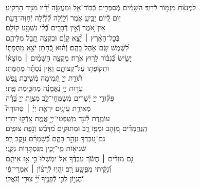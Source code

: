 \documentclass[twoside, openany, parskip=half, 11pt]{book}
\begin{document}
\begin{narrow}


לַמְנַצֵּ֗חַ מִזְמ֥וֹר לְֿדָוִֽד׃ \hfill \break
הַשָּׁמַ֗יִם מְֽֿסַפְּרִ֥ים כְּֿבֽוֹד־אֵ֑ל \hfill וּֽמַעֲשֵׂ֥ה יָ֝דָ֗יו מַגִּ֥יד הָרָקִֽיעַ׃ \\
י֣וֹם לְֿ֭יוֹם יַבִּ֣יעַֽ אֹ֑מֶר \hfill וְֿלַ֥יְֿלָה לְּֿ֝לַ֗יְֿלָה יְֿחַוֶּה־דָּֽעַת׃ \\
אֵֽין־אֹ֭מֶר וְֿאֵ֣ין דְּֿבָרִ֑ים \hfill בְּֿ֝לִ֗י נִשְׁמָ֥ע קוֹלָֽם׃ \\
בְּֿכׇל־הָאָ֨רֶץ ׀ יָ֘צָ֤א קַוָּ֗ם \hfill וּבִקְצֵ֣ה תֵ֭בֵל מִלֵּיהֶ֑ם \\
לַ֝שֶּׁ֗מֶשׁ שָֽׂם־אֹ֥הֶל בָּהֶֽם׃ \hfill
וְֿה֗וּא כְּֿ֭חָתָן יֹצֵ֣א מֵחֻפָּת֑וֹ\\
יָשִׂ֥ישׂ כְּֿ֝גִבּ֗וֹר לָר֥וּץ אֹֽרַח׃ \hfill
מִקְצֵ֤ה הַשָּׁמַ֨יִם ׀ מֽוֹצָא֗וֹ\\ וּתְקוּפָת֥וֹ עַל־קְצוֹתָ֑ם \hfill וְֿאֵ֥ין נִ֝סְתָּ֗ר מֵחַמָּתֽוֹ׃ \\
תּ֘וֹרַ֤ת יְיָ֣ תְּֿ֭מִימָה \hfill מְֿשִׁ֣יבַת נָ֑פֶשׁ \\
עֵד֥וּת יְיָ֥ נֶ֝אֱמָנָ֗ה \hfill מַחְכִּ֥ימַת פֶּֽתִי׃ \\
פִּקּ֘וּדֵ֤י יְיָ֣ יְֿ֭שָׁרִים מְֿשַׂמְּחֵי־לֵ֑ב \hfill מִצְוַ֥ת יְיָ֥ בָּ֝רָ֗ה\\
מְֿאִירַ֥ת עֵינָֽיִם׃ \hfill
יִרְאַ֤ת יְיָ֨ ׀ טְֿהוֹרָה֮ \\
עוֹמֶ֢דֶת לָ֫עַ֥ד \hfill מִֽשְׁפְּטֵי־יְיָ֥ אֱמֶ֑ת צָֽדְֿק֥וּ יַחְדָּֽו׃ \\
הַֽנֶּחֱמָדִ֗ים מִ֭זָּהָב וּמִפַּ֣ז רָ֑ב \hfill וּמְתוּקִ֥ים מִ֝דְּבַ֗שׁ וְֿנֹ֣פֶת צוּפִֽים׃ \\
גַּֽם־עַ֭בְדְּךָ נִזְהָ֣ר בָּהֶ֑ם \hfill בְּֿ֝שׇׁמְרָ֗ם עֵ֣קֶב רָֽב׃ \\
שְֿׁגִיא֥וֹת מִֽי־יָבִ֑ין \hfill מִֽנִּסְתָּר֥וֹת נַקֵּֽנִי׃ \\
גַּ֤ם מִזֵּדִ֨ים ׀ חֲשֹׂ֬ךְ עַבְדֶּ֗ךָ \hfill אַֽל־יִמְשְׁלוּ־בִ֣י אָ֣ז אֵיתָ֑ם \\
וְֿ֝נִקֵּ֗יתִי מִפֶּ֥שַֽׁע רָֽב׃ \hfill
יִ֥הְיֽוּ לְֿרָצ֨וֹן ׀ אִמְרֵי־פִ֡י\\
וְֿהֶגְי֣וֹן לִבִּ֣י לְֿפָנֶ֑יךָ \hfill יְ֝יָ֗ צוּרִ֥י וְֿגֹאֲלִֽי׃ \\


\enlargethispage{\baselineskip}


\end{narrow}
\end{document}
